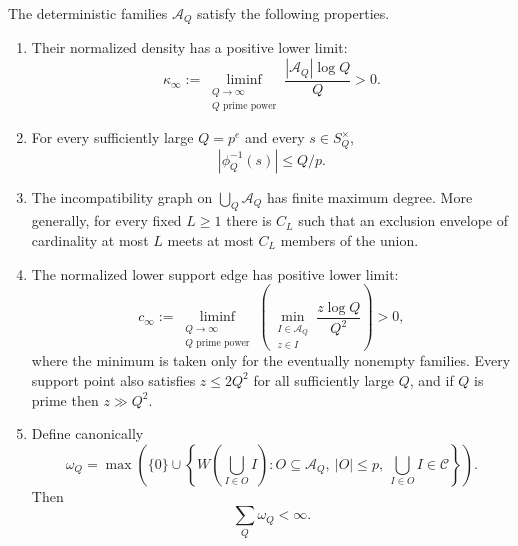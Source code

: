 \begin{proposition}\label{prop:signed-inverse-capabilities}
The deterministic families $\mathcal A_Q$ satisfy the following properties.
\begin{enumerate}
\item Their normalized density has a positive lower limit:
\begin{equation}\label{eq:family-density-liminf}
\kappa_\infty
:=
\liminf_{\substack{Q\to\infty\\Q\text{ prime power}}}
\frac{|\mathcal A_Q|\log Q}{Q}
>0.
\end{equation}
\item For every sufficiently large $Q=p^e$ and every $s\in S_Q^\times$,
\begin{equation}\label{eq:fibre-bound}
|\phi_Q^{-1}(s)|\le Q/p.
\end{equation}
\item The incompatibility graph on $\bigcup_Q\mathcal A_Q$ has finite maximum degree.  More generally, for every fixed $L\ge1$ there is $C_L$ such that an exclusion envelope of cardinality at most $L$ meets at most $C_L$ members of the union.
\item The normalized lower support edge has positive lower limit:
\begin{equation}\label{eq:support-liminf}
c_\infty
:=
\liminf_{\substack{Q\to\infty\\Q\text{ prime power}}}
\left(
\min_{\substack{I\in\mathcal A_Q\\z\in I}}
\frac{z\log Q}{Q^2}
\right)
>0,
\end{equation}
where the minimum is taken only for the eventually nonempty families.  Every support point also satisfies $z\le2Q^2$ for all sufficiently large $Q$, and if $Q$ is prime then $z\gg Q^2$.
\item Define canonically
\begin{equation}\label{eq:canonical-role-mass}
\omega_Q
=
\max\left(
\{0\}\cup
\left\{
W\!\left(\bigcup_{I\in O}I\right):
O\subseteq\mathcal A_Q,\ |O|\le p,\ \bigcup_{I\in O}I\in\mathcal C
\right\}
\right).
\end{equation}
Then
\begin{equation}\label{eq:role-summable}
\sum_Q\omega_Q<\infty.
\end{equation}
\end{enumerate}
\end{proposition}

